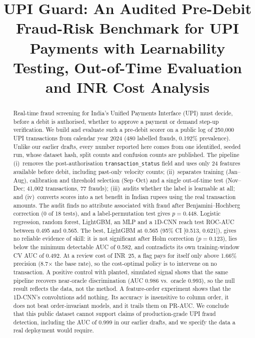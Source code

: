 \documentclass[conference]{IEEEtran}
\newcommand{\inr}{INR~}
\begin{document}
\title{UPI Guard: An Audited Pre-Debit Fraud-Risk Benchmark for UPI Payments with Learnability Testing, Out-of-Time Evaluation and INR Cost Analysis}

\author{
}

\maketitle

\begin{abstract}
Real-time fraud screening for India's Unified Payments Interface (UPI) must decide, before a debit is authorised, whether to approve a payment or demand step-up verification. We build and evaluate such a pre-debit scorer on a public log of 250,000 UPI transactions from calendar year 2024 (480 labelled frauds, 0.192\% prevalence). Unlike our earlier drafts, every number reported here comes from one identified, seeded run, whose dataset hash, split counts and confusion counts are published. The pipeline (i)~removes the post-authorisation \texttt{transaction\_status} field and uses only 24 features available before debit, including past-only velocity counts; (ii)~separates training (Jan--Aug), calibration and threshold selection (Sep--Oct) and a single out-of-time test (Nov--Dec; 41,002 transactions, 77 frauds); (iii)~audits whether the label is learnable at all; and (iv)~converts scores into a net benefit in Indian rupees using the real transaction amounts. The audit finds no attribute associated with fraud after Benjamini--Hochberg correction (0 of 18 tests), and a label-permutation test gives $p=0.448$. Logistic regression, random forest, LightGBM, an MLP and a 1D-CNN reach test ROC-AUC between 0.495 and 0.565. The best, LightGBM at 0.565 (95\% CI [0.513, 0.621]), gives no reliable evidence of skill: it is not significant after Holm correction ($p=0.123$), lies below the minimum detectable AUC of 0.582, and contradicts its own training-window CV AUC of 0.492. At a review cost of \inr25, a flag pays for itself only above 1.66\% precision (8.7$\times$ the base rate), so the cost-optimal policy is to intervene on no transaction. A positive control with planted, simulated signal shows that the same pipeline recovers near-oracle discrimination (AUC 0.986 vs.\ oracle 0.993), so the null result reflects the data, not the method. A feature-order experiment shows that the 1D-CNN's convolutions add nothing. Its accuracy is insensitive to column order, it does not beat order-invariant models, and it trails them on PR-AUC. We conclude that this public dataset cannot support claims of production-grade UPI fraud detection, including the AUC of 0.999 in our earlier drafts, and we specify the data a real deployment would require.
\end{abstract}
\end{document}
